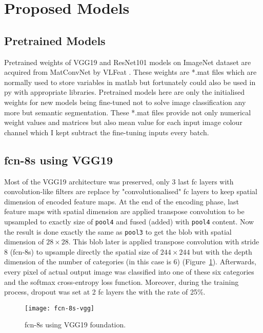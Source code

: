 \section{Proposed Models}
\subsection{Pretrained Models}
Pretrained weights of VGG19 and ResNet101 models on ImageNet dataset are
acquired from MatConvNet by VLFeat \cite{matconvnet_vgg19,
matconvnet_resnet101}. These weights are *.mat files which are normally used to
store variables in \gls{matlab} but fortunately could also be used in \Gls{py}
with appropriate libraries. Pretrained models here are only the initialised
weights for new models being fine-tuned not to solve image classification any
more but semantic segmentation. These *.mat files provide not only numerical
weight values and matrices but also mean value for each input image colour
channel which I kept subtract the fine-tuning inputs every batch.

\subsection{\acrshort{fcn}-8s using VGG19}
Most of the VGG19 architecture was preserved, only 3 last \acrshort{fc} layers
with convolution-like filters are replace by "convolutionalised" \acrshort{fc}
layers to keep spatial dimension of encoded feature maps. At the end of the
encoding phase, last feature maps with spatial dimension are applied transpose
convolution to be upsampled to exactly size of \texttt{pool4} and fused (added)
with \texttt{pool4} content. Now the result is done exactly the same as
\texttt{pool3} to get the blob with spatial dimension of $28 \times 28$.
This blob later is applied transpose convolution with stride 8
(\acrshort{fcn}-8s) to upsample directly the spatial size of $244 \times 244$
but with the depth dimension of the number of categories (in this case is 6)
(Figure~\ref{fig:fcn-8s-vgg}). Afterwards, every pixel of actual output image
was classified into one of these six categories and the softmax cross-entropy
loss function. Moreover, during the training process, dropout was set at 2
\acrshort{fc} layers the with the rate of 25\%.
\begin{figure}[h]
    \centering
    \texttt{[image: fcn-8s-vgg]}
    \caption{\acrshort{fcn}-8s using VGG19 foundation.}
    \label{fig:fcn-8s-vgg}
\end{figure}


